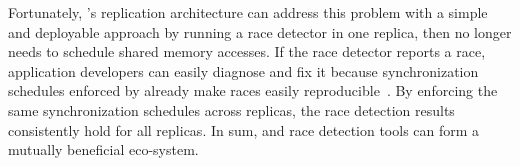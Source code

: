 Fortunately, \xxx's replication architecture can address this problem with a 
simple and deployable approach by running a race detector in one replica, then 
\dmt no longer needs to schedule shared memory accesses. If the race 
detector reports a race, application developers can easily diagnose and fix it 
because synchronization schedules enforced by \dmt already make races easily 
reproducible~\cite{pres:sosp09}. By enforcing the same synchronization 
schedules across replicas, the race detection results consistently hold for all 
replicas. In sum, \xxx and race detection tools can form a mutually beneficial 
eco-system.
